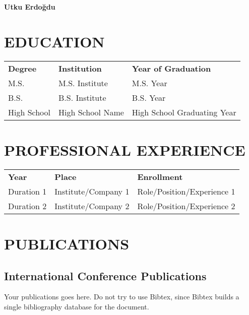 \curriculumvitae
\label{chapter:vita}

{\large \textbf{Utku Erdoğdu}}

\section*{\uppercase{Education}}

\begin{tabular}{lll}
\textbf{Degree} & \textbf{Institution} & \textbf{Year of Graduation} \\
M.S. & M.S. Institute & M.S. Year \\
B.S. & B.S. Institute & B.S. Year \\
High School & High School Name & High School Graduating Year
\end{tabular}

\section*{\uppercase{Professional Experience}}

\begin{tabular}{lll}
\textbf{Year} & \textbf{Place} & \textbf{Enrollment} \\
Duration 1 & Institute/Company 1 & Role/Position/Experience 1 \\
Duration 2 & Institute/Company 2 & Role/Position/Experience 2 
\end{tabular}

\section*{\uppercase{Publications}}
\subsection*{International Conference Publications}
Your publications goes here. Do not try to use Bibtex, since Bibtex builds a single bibliography
database for the document.
